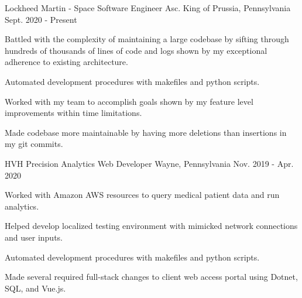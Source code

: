 

\begin{cventries}

  \cventry
    {Lockheed Martin - Space} %
    {Software Engineer Asc.} %
    {King of Prussia, Pennsylvania} %
    {Sept. 2020 - Present} %
    {
      \begin{cvitems} %
        \item {Battled with the complexity of maintaining a large codebase by sifting through hundreds of thousands of lines of code and logs shown by my exceptional adherence to existing architecture.}
        \item {Automated development procedures with makefiles and python scripts.}
        \item {Worked with my team to accomplish goals shown by my feature level improvements within time limitations.}
        \item {Made codebase more maintainable by having more deletions than insertions in my git commits.}
      \end{cvitems}
    }

  \cventry
    {HVH Precision Analytics} %
    {Web Developer} %
    {Wayne, Pennsylvania} %
    {Nov. 2019 - Apr. 2020} %
    {
      \begin{cvitems} %
        \item {Worked with Amazon AWS resources to query medical patient data and run analytics.}
        \item {Helped develop localized testing environment with mimicked network connections and user inputs.}
        \item {Automated development procedures with makefiles and python scripts.}
        \item {Made several required full-stack changes to client web access portal using Dotnet, SQL, and Vue.js.}
      \end{cvitems}
    }


\end{cventries}
